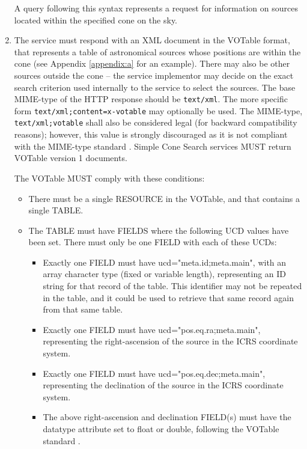 \documentclass[11pt,a4paper]{ivoa}
\begin{document}
\begin{enumerate}
	A query following this syntax represents a request for
	information on sources located within the specified cone on the sky.

	\item The service must respond with an XML document in the VOTable
		format, that represents a table of astronomical sources whose positions
		are within the cone (see Appendix \ref{appendix:a} for an example).
		There may also be other sources outside the cone -- the service
		implementor may decide on the exact search criterion used internally to
		the service to select the sources. The base MIME-type of the HTTP
		response should be \texttt{text/xml}. The more specific form
		\texttt{text/xml;content=x-votable} may optionally be used. The
		MIME-type, \texttt{text/xml;votable} shall also be considered legal (for
		backward compatibility reasons); however, this value is strongly
		discouraged as it is not compliant with the MIME-type standard
		\citep{std:MIME}. Simple Cone Search services MUST return VOTable
		version 1 documents.
		
		
		The VOTable MUST comply with these conditions:

		\begin{itemize}
			\item There must be a single RESOURCE in the VOTable,
				and that contains a single TABLE.
			\item The TABLE must have FIELDS where
				the following UCD values have been set. There must only be one FIELD
				with each of these UCDs:
				
				\begin{itemize}
					\item Exactly one FIELD must have ucd="meta.id;meta.main",
						with an array character type (fixed or variable
						length), representing an ID string for that record of the table. This
						identifier may not be repeated in the table, and it could be used to
						retrieve that same record again from that same table.
					\item Exactly one FIELD must have ucd="pos.eq.ra;meta.main",
						representing the right-ascension of the source in the ICRS coordinate system.
					\item Exactly one FIELD must have ucd="pos.eq.dec;meta.main",
						representing the declination of the source in the ICRS coordinate system.
					\item The above right-ascension and declination FIELD(s) must have the datatype
						attribute set to float or double, following the VOTable standard \citep{2019ivoa.spec.1021O}.
				\end{itemize}
			

\end{itemize}
\end{enumerate}
\end{document}
